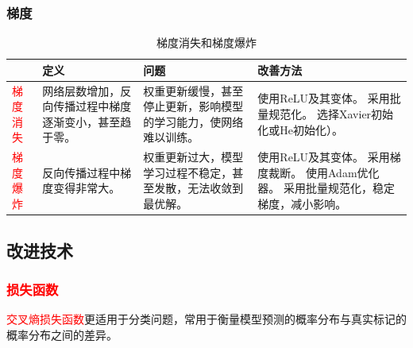 \documentclass[
12pt, %
a4paper, 
oneside, %
]{scrartcl}
\begin{document}
\subsubsection[梯度]{梯度}
\begin{table}[H]
\centering
\begin{tabular}{|p{0.5cm}|p{3.5cm}|p{3.5cm}|p{8cm}|}
\hline
 & 定义 & 问题 & 改善方法 \\
\hline
\textcolor{red}{梯度消失} & 网络层数增加，反向传播过程中梯度逐渐变小，甚至趋于零。 & 权重更新缓慢，甚至停止更新，影响模型的学习能力，使网络难以训练。 & 使用ReLU及其变体。 \newline 采用批量规范化。 \newline 选择Xavier初始化或He初始化）。 \\
\hline
\textcolor{red}{梯度爆炸} & 反向传播过程中梯度变得非常大。 & 权重更新过大，模型学习过程不稳定，甚至发散，无法收敛到最优解。 & 使用ReLU及其变体。 \newline 采用梯度裁断。 \newline 使用Adam优化器。 \newline 采用批量规范化，稳定梯度，减小影响。 \\
\hline
\end{tabular}
\caption{梯度消失和梯度爆炸}
\end{table}
\subsection[改进技术]{改进技术}
\subsubsection[损失函数]{\textcolor{red}{损失函数}}
\textcolor{red}{交叉熵损失函数}更适用于分类问题，常用于衡量模型预测的概率分布与真实标记的概率分布之间的差异。
\end{document}
